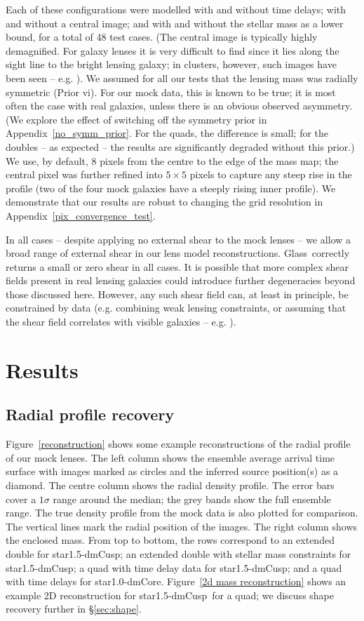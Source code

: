 \documentclass[galley,usenatbib]{mn2e}
\newcommand{\Glass}{{\sc Glass}}
\newcommand{\figref}[1] {Figure~\ref{#1}}
\newcommand{\secref}[1] {\S\ref{#1}}
\newcommand{\appref}[1] {Appendix~\ref{#1}}
\newcommand{\mockAA}{{\sc star1.0-dmCore}}
\newcommand{\mockBC}{{\sc star1.5-dmCusp}}
\begin{document}
Each of these configurations were modelled with and without time delays; with
and without a central image; and with and without the stellar mass as a lower
bound, for a total of 48 test cases. (The central image is typically highly
demagnified. For galaxy lenses it is very difficult to find since it lies along
the sight line to the bright lensing galaxy; in clusters, however, such images
have been seen -- e.g. \citealt{2005PASJ...57L...7I}). We assumed for all our
tests that the lensing mass was radially symmetric (Prior vi). For our mock
data, this is known to be true; it is most often the case with real galaxies,
unless there is an obvious observed asymmetry. (We explore the effect of
switching off the symmetry prior in \appref{no_symm_prior}. For the
quads, the difference is small; for the doubles -- as expected -- the results
are significantly degraded without this prior.) We use, by default, 8 pixels
from the centre to the edge of the mass map; the central pixel was further
refined into $5\times5$ pixels to capture any steep rise in the profile (two of
the four mock galaxies have a steeply rising inner profile). We demonstrate
that our results are robust to changing the grid resolution in 
\appref{pix_convergence_test}.

In all cases -- despite applying no external shear to the mock lenses -- we allow a broad range of external shear in our lens model reconstructions. \Glass\ correctly returns a small or zero shear in all cases. It is possible that more complex shear fields present in real lensing galaxies could introduce further degeneracies beyond those discussed here. However, any such shear field can, at least in principle, be constrained by data (e.g. combining
weak lensing constraints, or assuming that the shear field correlates with
visible galaxies -- e.g. \citealt{2009A&A...500..681M,2011ApJ...726...84W}).

\section{Results}\label{sec:results}

\subsection{Radial profile recovery}

\figref{reconstruction} shows some example reconstructions of the radial
profile of our mock lenses. The left column shows the ensemble average arrival
time surface with images marked as circles and the inferred source position(s)
as a diamond. The centre column shows the radial density profile. The error
bars cover a $1\sigma$ range around the median; the grey bands show the full
ensemble range. The true density profile from the mock data is also plotted for
comparison. The vertical lines mark the radial position of the images. The
right column shows the enclosed mass. From top to bottom, the rows correspond
to an extended double for \mockBC; an extended double with stellar mass
constraints for \mockBC; a quad with time delay data for \mockBC; and a quad
with time delays for \mockAA. \figref{2d mass reconstruction} shows an example
2D reconstruction for \mockBC\ for a quad; we discuss shape recovery further in
\secref{sec:shape}.
\end{document}
